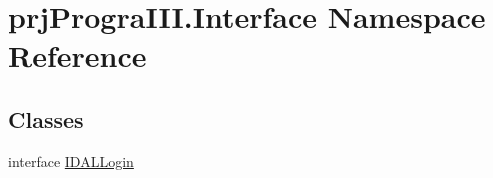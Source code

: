 \hypertarget{namespaceprj_progra_i_i_i_1_1_interface}{}\section{prj\+Progra\+I\+I\+I.\+Interface Namespace Reference}
\label{namespaceprj_progra_i_i_i_1_1_interface}
\subsection*{Classes}
\begin{DoxyCompactItemize}
\item 
interface \hyperlink{interfaceprj_progra_i_i_i_1_1_interface_1_1_i_d_a_l_login}{I\+D\+A\+L\+Login}
\end{DoxyCompactItemize}
